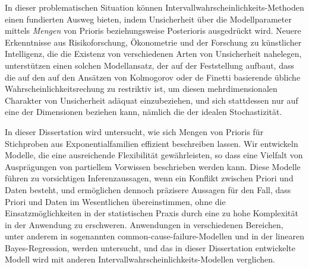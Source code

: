 In dieser problematischen Situation können Intervallwahrscheinlichkeits-Methoden einen
fundierten Ausweg bieten, indem Unsicherheit über die Modellparameter mittels
\emph{Mengen} von Prioris beziehungsweise Posterioris ausgedrückt wird.
Neuere Erkenntnisse aus Risikoforschung, Ökonometrie und der Forschung zu künstlicher Intelligenz,
die die Existenz von verschiedenen Arten von Unsicherheit nahelegen,
unterstützen einen solchen Modellansatz,
der auf der Feststellung aufbaut, dass die auf den
auf den Ansätzen von Kolmogorov oder de Finetti basierende
übliche Wahrscheinlichkeitsrechung zu restriktiv ist,
um diesen mehrdimensionalen Charakter von Unsicherheit adäquat einzubeziehen,
und sich stattdessen nur auf eine der Dimensionen beziehen kann,
nämlich die der idealen Stochastizität.

In dieser Dissertation wird untersucht, wie sich Mengen von Prioris
für Stichproben aus Exponentialfamilien effizient beschreiben lassen.
Wir entwickeln Modelle, die eine ausreichende Flexibilität gewährleisten,
so dass eine Vielfalt von Ausprägungen von partiellem Vorwissen beschrieben werden kann.
Diese Modelle führen zu vorsichtigen Inferenzaussagen,
wenn ein Konflikt zwischen Priori und Daten besteht,
und ermöglichen dennoch präzisere Aussagen für den Fall, dass Priori und Daten im Wesentlichen übereinstimmen,
ohne die Einsatzmöglichkeiten in der statistischen Praxis durch
eine zu hohe Komplexität in der Anwendung zu erschweren.
Anwendungen in verschiedenen Bereichen, unter anderem in sogenannten
common-cause-failure-Modellen und in der linearen Bayes-Regression,
werden untersucht, 
und das in dieser Dissertation entwickelte Modell wird mit anderen Intervallwahrscheinlichkeits-Modellen verglichen.


